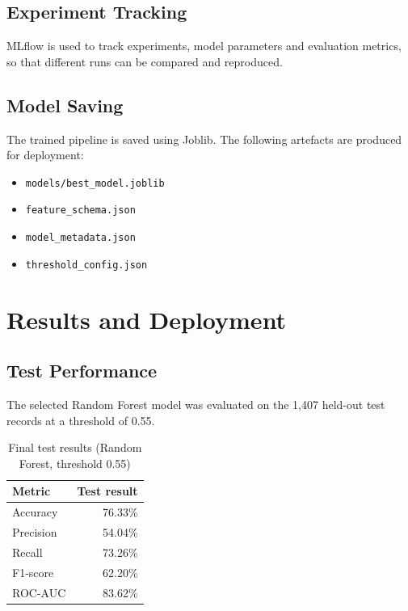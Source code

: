 \documentclass[12pt,a4paper]{report}
\begin{document}
\section{Experiment Tracking}

MLflow is used to track experiments, model parameters and evaluation metrics, so that different runs can be compared and reproduced.

\section{Model Saving}

The trained pipeline is saved using Joblib. The following artefacts are produced for deployment:

\begin{itemize}
\item \texttt{models/best\_model.joblib}
\item \texttt{feature\_schema.json}
\item \texttt{model\_metadata.json}
\item \texttt{threshold\_config.json}
\end{itemize}

\chapter{Results and Deployment}

\section{Test Performance}

The selected Random Forest model was evaluated on the 1,407 held-out test records at a threshold of 0.55.

\begin{table}[!htbp]
\centering
\caption{Final test results (Random Forest, threshold 0.55)}
\begin{tabular}{lr}
\toprule
\textbf{Metric} & \textbf{Test result} \\
\midrule
Accuracy & 76.33\% \\
Precision & 54.04\% \\
Recall & 73.26\% \\
F1-score & 62.20\% \\
ROC-AUC & 83.62\% \\
\bottomrule
\end{tabular}
\label{tab:test_results}
\end{table}
\end{document}
